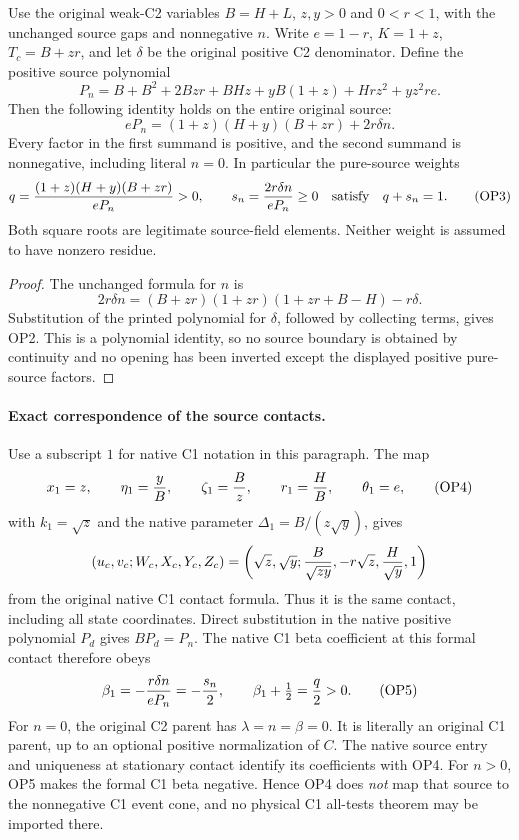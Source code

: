 Use the original weak-C2 variables $B=H+L$, $z,y>0$ and $0<r<1$,
with the unchanged source gaps and nonnegative $n$. Write $e=1-r$,
$K=1+z$, $T_c=B+zr$, and let $\delta$ be the original positive
C2 denominator. Define the positive source polynomial
\[
 P_n=B+B^2+2Bzr+BHz+yB(1+z)+Hrz^2+yz^2re.
 \tag{OP1}
\]
Then the following identity holds on the entire original source:
\[
 \boxed{\quad eP_n=(1+z)(H+y)(B+zr)+2r\delta n.\quad}
 \tag{OP2}
\]
Every factor in the first summand is positive, and the second summand
is nonnegative, including literal $n=0$. In particular the pure-source
weights
\[
 q={ (1+z)(H+y)(B+zr)\over eP_n}>0,
 \qquad s_n={2r\delta n\over eP_n}\ge0
 \quad\hbox{satisfy}\quad q+s_n=1.                   \tag{OP3}
\]
Both square roots are legitimate source-field elements. Neither weight
is assumed to have nonzero residue.

\begin{proof}
The unchanged formula for $n$ is
\[
 2r\delta n=(B+zr)(1+zr)(1+zr+B-H)-r\delta.
\]
Substitution of the printed polynomial for $\delta$, followed by
collecting terms, gives OP2. This is a polynomial identity, so no
source boundary is obtained by continuity and no opening has been
inverted except the displayed positive pure-source factors.
\end{proof}

\paragraph{Exact correspondence of the source contacts.}
Use a subscript $1$ for native C1 notation in this paragraph. The map
\[
 x_1=z,\qquad \eta_1={y\over B},\qquad
 \zeta_1={B\over z},\qquad r_1={H\over B},\qquad
 \theta_1=e,
 \tag{OP4}
\]
with $k_1=\sqrt z$ and the native parameter
$\Delta_1=B/(z\sqrt y)$, gives
\[
 (u_c,v_c;W_c,X_c,Y_c,Z_c)
 =\left(\sqrt z,\sqrt y;{B\over\sqrt{zy}},
                       -r\sqrt z,{H\over\sqrt y},1\right)
\]
from the original native C1 contact formula. Thus it is the same
contact, including all state coordinates. Direct substitution in the
native positive polynomial $P_d$ gives $BP_d=P_n$.
The native C1 beta coefficient at this formal contact therefore obeys
\[
 \beta_1=-{r\delta n\over eP_n}=-{s_n\over2},
 \qquad \beta_1+\tfrac12={q\over2}>0.                 \tag{OP5}
\]
For $n=0$, the original C2 parent has
$\lambda=n=\beta=0$. It is literally an original C1 parent,
up to an optional positive normalization of $C$. The native source
entry and uniqueness at stationary contact identify its coefficients
with OP4. For $n>0$, OP5 makes the formal C1 beta negative. Hence
OP4 does \emph{not} map that source to the nonnegative C1 event cone,
and no physical C1 all-tests theorem may be imported there.

